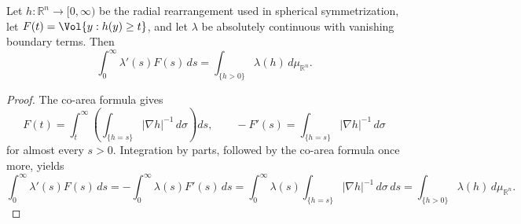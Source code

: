 \begin{proposition}
\label{prop:chow-iii-appj-solution-22-18}
Let \(h:\mathbb R^n\to[0,\infty)\) be the radial rearrangement used in
spherical symmetrization, let
\(F(t)=\Vol\{y:h(y)\geq t\}\), and let \(\lambda\) be absolutely continuous
with vanishing boundary terms.  Then
\[
 \int_0^\infty\lambda'(s)F(s)\,ds
 =\int_{\{h>0\}}\lambda(h)\,d\mu_{\mathbb R^n}.
\]
\end{proposition}
\begin{proof}
\sketch
The co-area formula gives
\[
 F(t)=\int_t^\infty\left(\int_{\{h=s\}}|\nabla h|^{-1}\,d\sigma\right)ds,
 \qquad
 -F'(s)=\int_{\{h=s\}}|\nabla h|^{-1}\,d\sigma
\]
for almost every \(s>0\).  Integration by parts, followed by the co-area
formula once more, yields
\[
 \int_0^\infty\lambda'(s)F(s)\,ds
 =-\int_0^\infty\lambda(s)F'(s)\,ds
 =\int_0^\infty\lambda(s)
   \int_{\{h=s\}}|\nabla h|^{-1}\,d\sigma\,ds
 =\int_{\{h>0\}}\lambda(h)\,d\mu_{\mathbb R^n}.
\]
\end{proof}

